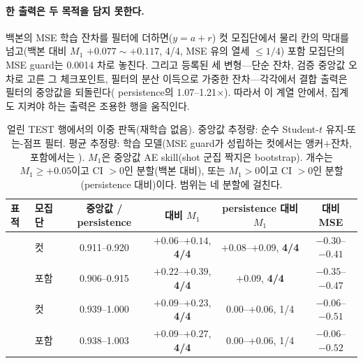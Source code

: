 \documentclass[10pt,a4paper]{article}
\begin{document}
\paragraph{한 출력은 두 목적을 담지 못한다.} 백본의 MSE 학습 잔차를 필터에
더하면($y = a + r$) 컷 모집단에서 물리 칸의 막대를 넘고(백본 대비 $M_1$
$+0.077\sim+0.117$, 4/4, MSE 유의 열세 $\le 1/4$) 포함 모집단의 MSE guard는 0.0014
차로 놓친다. 그리고 등록된 세 변형---단순 잔차, 검증 중앙값 오차로 고른 그
체크포인트, 필터의 분산 이득으로 가중한 잔차---각각에서 결합 출력은 필터의 중앙값을
되돌린다(\Vrot{} persistence의 1.07--1.21$\times$). 따라서 이 계열 안에서, 집계도
지켜야 하는 출력은 조용한 행을 움직인다.

\begin{table}[t]
  \centering
  \caption{얼린 TEST 행에서의 이중 판독(재학습 없음). 중앙값 추정량: 순수
  Student-$t$ 유지-또는-점프 필터. 평균 추정량: 학습 모델(MSE guard가 성립하는
  컷에서는 앵커$+$잔차, 포함에서는 \seqv{}). $M_1$은 중앙값 AE skill(shot 군집
  짝지은 bootstrap). 개수는 $M_1 \ge +0.05$이고 CI $> 0$인 분할(백본 대비), 또는
  $M_1 > 0$이고 CI $> 0$인 분할(persistence 대비)이다. 범위는 네 분할에 걸친다.}
  \label{tab:dual}
  \small
  \begin{tabular}{llcccc}
    \toprule
    표적 & 모집단 & 중앙값 / persistence & \seqv{} 대비 $M_1$ & persistence 대비 $M_1$ & \seqv{} 대비 MSE \\
    \midrule
    \Ti{}   & 컷   & 0.911--0.920 & $+0.06$--$+0.14$, \textbf{4/4} & $+0.08$--$+0.09$, \textbf{4/4} & $-0.30$--$-0.41$ \\
            & 포함 & 0.906--0.915 & $+0.22$--$+0.39$, \textbf{4/4} & $+0.09$, \textbf{4/4} & $-0.35$--$-0.47$ \\
    \Vrot{} & 컷   & 0.939--1.000 & $+0.09$--$+0.23$, \textbf{4/4} & $0.00$--$+0.06$, 1/4 & $-0.06$--$-0.51$ \\
            & 포함 & 0.938--1.003 & $+0.09$--$+0.27$, \textbf{4/4} & $0.00$--$+0.06$, 1/4 & $-0.06$--$-0.52$ \\
    \bottomrule
  \end{tabular}
\end{table}
\end{document}
